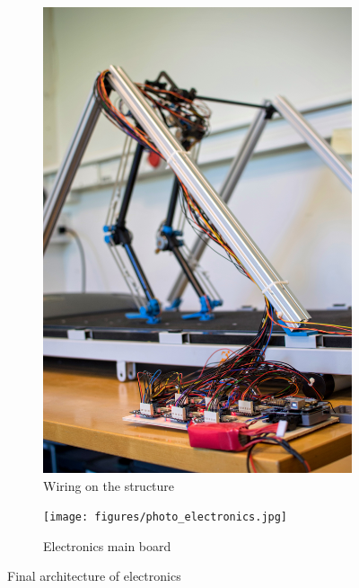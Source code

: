 \begin{figure}[h]
\centering
	\begin{subfigure}[b]{0.4\textwidth}
		\includegraphics[width=\textwidth]{figures/photo_electronics_2.jpg}
		\caption{Wiring on the structure}
		\label{fig:electronics1}
	\end{subfigure}
	\begin{subfigure}[b]{0.4\textwidth}
		\texttt{[image: figures/photo\_electronics.jpg]}
		\caption{Electronics main board}
		\label{fig:electronics2}
	\end{subfigure}
	\caption{Final architecture of electronics}
\end{figure}



